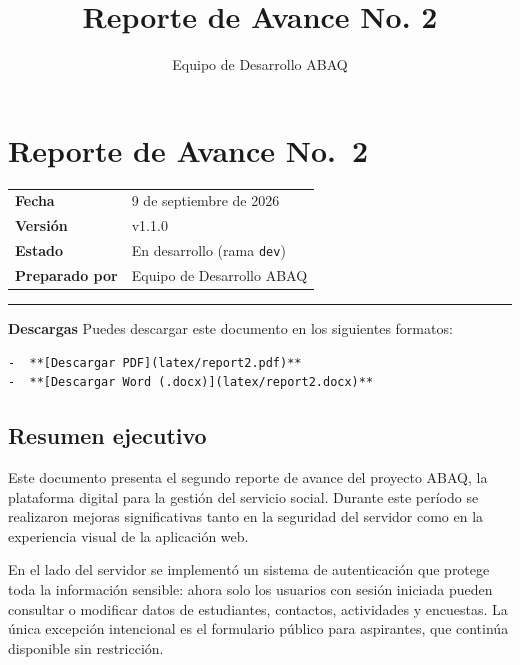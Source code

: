 \documentclass[
]{article}
\title{Reporte de Avance No. 2}
\author{Equipo de Desarrollo ABAQ}
\date{}
\newcounter{none} %
\begin{document}
\maketitle

{
\setcounter{tocdepth}{3}
\tableofcontents
}
\section{Reporte de Avance No.~2}\label{reporte-de-avance-no.-2}

{\def\LTcaptype{none} %
\begin{longtable}[]{@{}ll@{}}
\toprule\noalign{}
\endhead
\bottomrule\noalign{}
\endlastfoot
\textbf{Fecha} & 9 de septiembre de 2026 \\
\textbf{Versión} & v1.1.0 \\
\textbf{Estado} & En desarrollo (rama \texttt{dev}) \\
\textbf{Preparado por} & Equipo de Desarrollo ABAQ \\
\end{longtable}
}

\begin{center}\rule{0.5\linewidth}{0.5pt}\end{center}

\textbf{Descargas} Puedes descargar este documento en los siguientes
formatos:

\begin{verbatim}
-  **[Descargar PDF](latex/report2.pdf)**
-  **[Descargar Word (.docx)](latex/report2.docx)**
\end{verbatim}

\subsection{Resumen ejecutivo}\label{resumen-ejecutivo}

Este documento presenta el segundo reporte de avance del proyecto ABAQ,
la plataforma digital para la gestión del servicio social. Durante este
período se realizaron mejoras significativas tanto en la seguridad del
servidor como en la experiencia visual de la aplicación web.

En el lado del servidor se implementó un sistema de autenticación que
protege toda la información sensible: ahora solo los usuarios con sesión
iniciada pueden consultar o modificar datos de estudiantes, contactos,
actividades y encuestas. La única excepción intencional es el formulario
público para aspirantes, que continúa disponible sin restricción.
\end{document}
